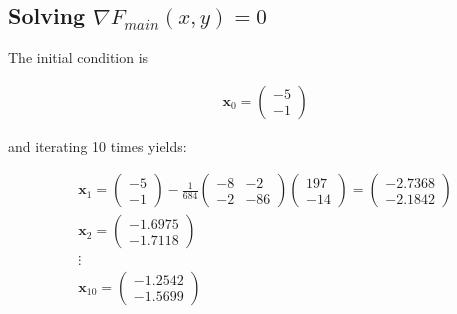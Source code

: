 \documentclass[../main.tex]{subfiles}
\begin{document}
    \subsection*{Solving $\nabla F_{main}(x,y) = 0$}\label{subsec:2d-nr-solving-f}
    The initial condition is
    \begin{center*}
        \begin{align*}
            & \mathbf{x}_{0} = \begin{pmatrix}
                -5 \\ -1
            \end{pmatrix}
        \end{align*}
    \end{center*}
    and iterating 10 times yields:
    \begin{center*}
        \begin{align*}
            & \mathbf{x}_{1} = \begin{pmatrix}
                -5 \\ -1
            \end{pmatrix} - \frac{1}{684}\begin{pmatrix}
                -8 & -2 \\
                -2 & -86
            \end{pmatrix}\begin{pmatrix}
                197 \\
                -14
            \end{pmatrix} = \begin{pmatrix}
                -2.7368 \\ -2.1842
            \end{pmatrix} \\
            & \mathbf{x}_{2} = \begin{pmatrix}
                -1.6975 \\ -1.7118
            \end{pmatrix} \\
            & \vdots \\
            & \mathbf{x}_{10} = \begin{pmatrix}
                -1.2542 \\ -1.5699
            \end{pmatrix}
        \end{align*}
    \end{center*}
\end{document}
